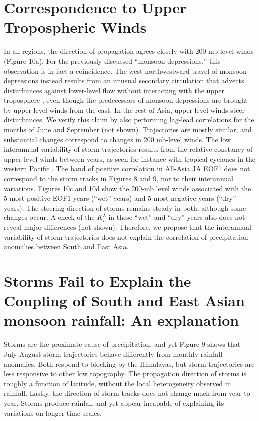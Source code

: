 \section{Correspondence to Upper Tropospheric Winds}	 
	 
	 In all regions, the direction of propagation agrees closely with 200 mb-level winds (Figure 10a). For the previously discussed ``monsoon depressions,'' this observation is in fact a coincidence. The west-northwestward travel of monsoon depressions instead results from an unusual secondary circulation that advects disturbances against lower-level flow without interacting with the upper troposphere \parencite{Chen2000,Chen2005}, even though the predecessors of monsoon depressions are brought by upper-level winds from the east. In the rest of Asia, upper-level winds steer disturbances. We verify this claim by also performing lag-lead correlations for the months of June and September (not shown). Trajectories are mostly similar, and substantial changes correspond to changes in 200 mb-level winds. The low interannual variability of storm trajectories results from the relative constancy of upper-level winds between years, as seen for instance with tropical cyclones in the western Pacific \parencite{Kumar2005}. The band of positive correlation in All-Asia JA EOF1 does not correspond to the storm tracks in Figures 8 and 9, nor to their interannual variations. Figures 10c and 10d show the 200-mb level winds associated with the 5 most positive EOF1 years (``wet'' years) and 5 most negative years (``dry'' years). The steering direction of storms remains steady in both, although some changes occur. A check of the $K_i^\lambda$ in these ``wet'' and ``dry'' years also does not reveal major differences (not shown). Therefore, we propose that the interannual variability of storm trajectories does not explain the correlation of precipitation anomalies between South and East Asia.
	 
\section{Storms Fail to Explain the Coupling of South and East Asian monsoon rainfall: An explanation}
	 
	 Storms are the proximate cause of precipitation, and yet Figure 9 shows that July-August storm trajectories behave differently from monthly rainfall anomalies. Both respond to blocking by the Himalayas, but storm trajectories are less responsive to other low topography. The propagation direction of storms is roughly a function of latitude, without the local heterogeneity observed in rainfall. Lastly, the direction of storm tracks does not change much from year to year. Storms produce rainfall and yet appear incapable of explaining its variations on longer time scales.
	 
